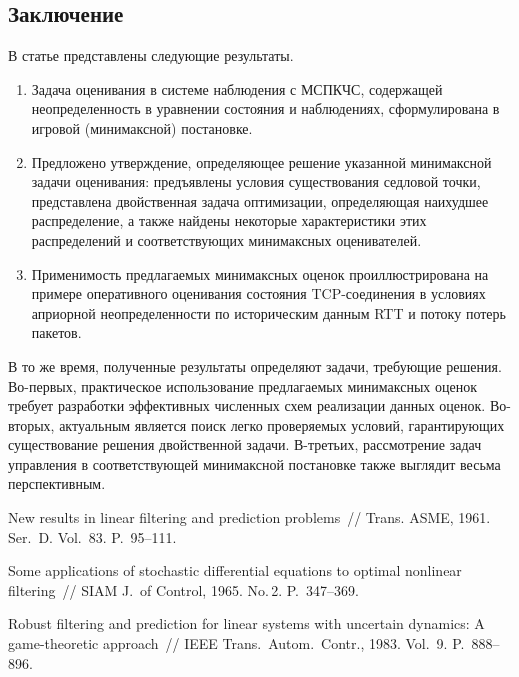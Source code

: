 \begin{multicols}{2}

 \section{Заключение} %

 В статье представлены следующие результаты.
\begin{enumerate}[1.]
\item
Задача оценивания в системе наблюдения с МСПКЧС, содержащей
неопределенность в уравнении состояния и наблюдениях, сформулирована
в игровой (минимаксной) постановке.
\item
Предложено утверждение, определяющее решение указанной минимаксной
задачи оценивания: предъявлены условия существования седловой точки,
представлена двойственная задача оптимизации, определяющая наихудшее
распределение, а также найдены некоторые характеристики этих
распределений и соответствующих минимаксных оценивателей.
\item
Применимость предлагаемых минимаксных оценок проиллюстрирована на
примере оперативного оценивания состояния TCP-соединения в условиях
априорной неопределенности по историческим данным RTT и потоку
потерь пакетов.
\end{enumerate}

 В то же время, полученные результаты определяют задачи, требующие решения.
 Во-первых, практическое использование предлагаемых минимаксных оценок
 требует разработки эффективных численных схем реализации данных оценок.
 Во-вторых, актуальным является поиск легко проверяемых условий, гарантирующих
 существование\linebreak
  решения двойственной задачи. В-третьих, рас\-смот\-рение задач
 управления в соответствующей минимаксной постановке также выглядит
 весьма перспективным.

{\small\frenchspacing
{%
\begin{thebibliography}{99}
 New results in
 linear filtering and prediction problems~// Trans. ASME, 1961.
 Ser.~D. Vol.~83. P.~{95--111}.

 Some applications of stochastic differential equations to optimal nonlinear filtering~//
 SIAM J.\ of Control, 1965. No.\,2. P.~347--369.

Robust filtering and
prediction for linear systems with uncertain dynamics:
 A game-theoretic approach~//
 IEEE Trans.\ Autom.\ Contr., 1983. Vol.~9. P.~\mbox{888--896}.



\end{thebibliography}}}
\end{multicols}
